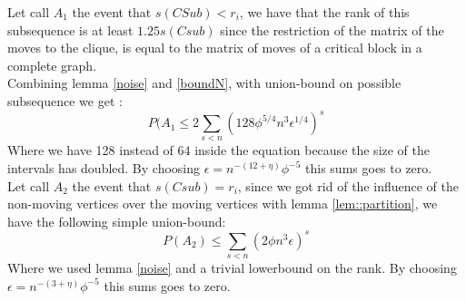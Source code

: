 Let call $A_1$ the event that $s(CSub) < r_i$, we have that the rank of this subsequence is at least $1.25 s(Csub)$ since the restriction of the matrix of the moves to the clique, is equal to the matrix of moves of a critical block in a complete graph.\\
Combining lemma \ref{noise} and \ref{boundN}, with union-bound on possible subsequence we get :
\begin{equation*}
P(A_1 \leq 2 \sum_{s < n}(128\phi^{5/4}n^3\epsilon^{1/4})^s
\end{equation*}
Where we have 128 instead of 64 inside the equation because the size of the intervals has doubled.
By choosing $\epsilon = n^{-(12 + \eta)}\phi^{-5}$ this sums goes to zero.\\

Let call $A_2$ the event that $s(Csub) = r_i$, since we got rid of the influence of the non-moving vertices over the moving vertices with lemma \ref{lem::partition}, we have the following simple union-bound:
\begin{equation*}
P(A_2) \leq \sum_{s < n}(2\phi n^3 \epsilon)^s
\end{equation*}
Where we used lemma \ref{noise} and a trivial lowerbound on the rank.
By choosing $\epsilon = n^{-(3 + \eta)}\phi^{-5}$ this sums goes to zero. 

